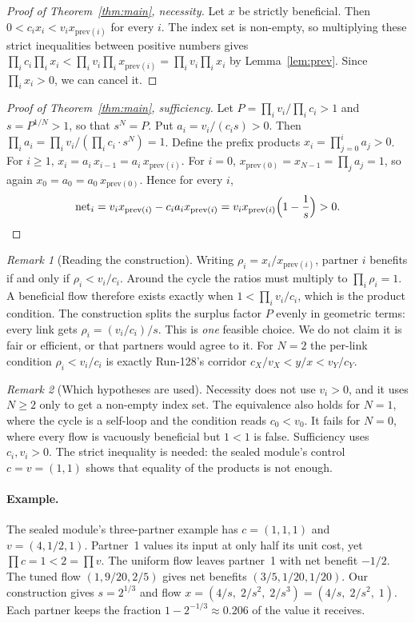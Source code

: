 \documentclass[11pt]{article}
\theoremstyle{definition}
\theoremstyle{remark}
\newtheorem*{remark}{Remark}
\begin{document}
\begin{proof}[Proof of Theorem~\ref{thm:main}, necessity]
Let $x$ be strictly beneficial. Then $0<c_ix_i<v_ix_{\mathrm{prev}(i)}$ for every $i$. The index set
is non-empty, so multiplying these strict inequalities between positive numbers gives
$\prod_ic_i\prod_ix_i<\prod_iv_i\prod_ix_{\mathrm{prev}(i)}=\prod_iv_i\prod_ix_i$ by
Lemma~\ref{lem:prev}. Since $\prod_ix_i>0$, we can cancel it.
\end{proof}

\begin{proof}[Proof of Theorem~\ref{thm:main}, sufficiency]
Let $P=\prod_iv_i/\prod_ic_i>1$ and $s=P^{1/N}>1$, so that $s^N=P$. Put $a_i=v_i/(c_is)>0$. Then
$\prod_ia_i=\prod_iv_i/(\prod_ic_i\cdot s^N)=1$. Define the prefix products
$x_i=\prod_{j=0}^{i}a_j>0$. For $i\ge1$, $x_i=a_i\,x_{i-1}=a_i\,x_{\mathrm{prev}(i)}$. For $i=0$,
$x_{\mathrm{prev}(0)}=x_{N-1}=\prod_ja_j=1$, so again $x_0=a_0=a_0\,x_{\mathrm{prev}(0)}$. Hence for
every $i$,
\[
\mathrm{net}_i=v_ix_{\mathrm{prev}(i)}-c_ia_ix_{\mathrm{prev}(i)}
=v_ix_{\mathrm{prev}(i)}\Bigl(1-\frac1s\Bigr)>0. \qedhere
\]
\end{proof}

\begin{remark}[Reading the construction]
Writing $\rho_i=x_i/x_{\mathrm{prev}(i)}$, partner $i$ benefits if and only if $\rho_i<v_i/c_i$.
Around the cycle the ratios must multiply to $\prod_i\rho_i=1$. A beneficial flow therefore exists
exactly when $1<\prod_iv_i/c_i$, which is the product condition. The construction splits the
surplus factor $P$ evenly in geometric terms: every link gets $\rho_i=(v_i/c_i)/s$. This is
\emph{one} feasible choice. We do not claim it is fair or efficient, or that partners would agree to
it. For $N=2$ the per-link condition $\rho_i<v_i/c_i$ is exactly Run-128's corridor
$c_X/v_X<y/x<v_Y/c_Y$.
\end{remark}

\begin{remark}[Which hypotheses are used]
Necessity does not use $v_i>0$, and it uses $N\ge2$ only to get a non-empty index set. The
equivalence also holds for $N=1$, where the cycle is a self-loop and the condition reads $c_0<v_0$.
It fails for $N=0$, where every flow is vacuously beneficial but $1<1$ is false. Sufficiency uses
$c_i,v_i>0$. The strict inequality is needed: the sealed module's control
$c=v=(1,1)$ shows that equality of the products is not enough.
\end{remark}

\paragraph{Example.} The sealed module's three-partner example has $c=(1,1,1)$ and $v=(4,1/2,1)$.
Partner~1 values its input at only half its unit cost, yet $\prod c=1<2=\prod v$. The uniform flow
leaves partner~1 with net benefit $-1/2$. The tuned flow $(1,9/20,2/5)$ gives net benefits
$(3/5,1/20,1/20)$. Our construction gives $s=2^{1/3}$ and flow
$x=(4/s,\;2/s^2,\;2/s^3)=(4/s,\;2/s^2,\;1)$. Each partner keeps the fraction
$1-2^{-1/3}\approx0.206$ of the value it receives.
\end{document}
